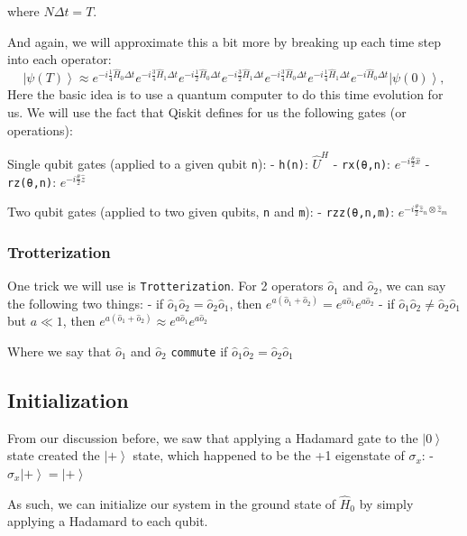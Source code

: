 \documentclass[11pt]{article}
\providecommand{\ket}[1]{\left|#1\right\rangle}
\begin{document}
where \(N\Delta t = T\).

And again, we will approximate this a bit more by breaking up each time
step into each operator: \[
\ket{\psi(T)} \approx 
e^{-i\tfrac{1}{4}\hat{H}_0\Delta t}e^{-i\tfrac{3}{4}\hat{H}_1\Delta t}
e^{-i\tfrac{1}{2}\hat{H}_0\Delta t}e^{-i\tfrac{3}{2}\hat{H}_1\Delta t}
e^{-i\tfrac{3}{4}\hat{H}_0\Delta t}e^{-i\tfrac{1}{4}\hat{H}_1\Delta t}
e^{-i\hat{H}_0\Delta t}           
\ket{\psi(0)},
\] Here the basic idea is to use a quantum computer to do this time
evolution for us. We will use the fact that Qiskit defines for us the
following gates (or operations):

Single qubit gates (applied to a given qubit \texttt{n}): -
\texttt{h(n)}: \(\hat{U}^H\) - \texttt{rx(θ,n)}:
\(e^{-i\tfrac{\theta}{2} \hat{x}}\) - \texttt{rz(θ,n)}:
\(e^{-i\tfrac{\theta}{2} \hat{z}}\)

Two qubit gates (applied to two given qubits, \texttt{n} and
\texttt{m}): - \texttt{rzz(θ,n,m)}:
\(e^{-i\tfrac{\theta}{2} \hat{z}_n\otimes \hat{z}_m}\)

\subsubsection{Trotterization}\label{trotterization}

One trick we will use is \texttt{Trotterization}. For 2 operators
\(\hat{o}_1\) and \(\hat{o}_2\), we can say the following two things: -
if \(\hat{o}_1\hat{o}_2 = \hat{o}_2\hat{o}_1\), then
\(e^{a\left(\hat{o}_1 + \hat{o}_2\right)} = e^{a\hat{o}_1}e^{a\hat{o}_2}\)
- if \(\hat{o}_1\hat{o}_2 \neq \hat{o}_2\hat{o}_1\) but \(a\ll 1\), then
\(e^{a\left(\hat{o}_1 + \hat{o}_2\right)} \approx e^{a\hat{o}_1}e^{a\hat{o}_2}\)

Where we say that \(\hat{o}_1\) and \(\hat{o}_2\) \texttt{commute} if
\(\hat{o}_1\hat{o}_2 = \hat{o}_2\hat{o}_1\)

\subsection{Initialization}\label{initialization}

From our discussion before, we saw that applying a Hadamard gate to the
\(\ket{0}\) state created the \(\ket{+}\) state, which happened to be
the +1 eigenstate of \(\sigma_x\): - \(\sigma_x\ket{+} = \ket{+}\)

As such, we can initialize our system in the ground state of
\(\hat{H}_0\) by simply applying a Hadamard to each qubit.
\end{document}
